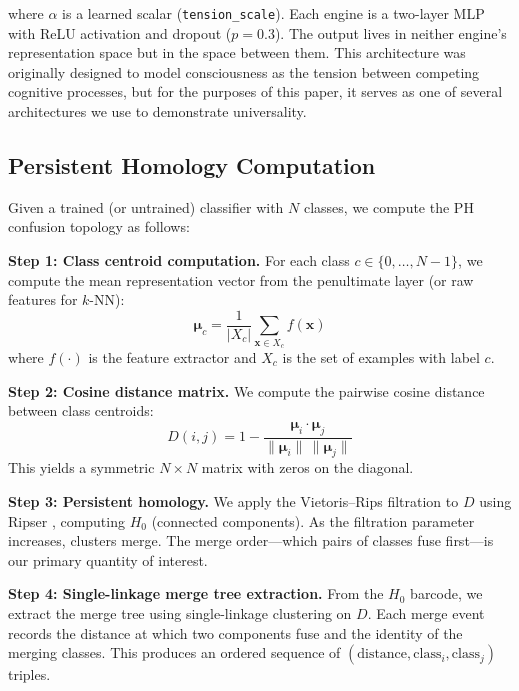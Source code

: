 \documentclass[11pt,a4paper]{article}
\begin{document}
\noindent where $\alpha$ is a learned scalar (\texttt{tension\_scale}). Each engine is a two-layer MLP with ReLU activation and dropout ($p = 0.3$). The output lives in neither engine's representation space but in the space between them. This architecture was originally designed to model consciousness as the tension between competing cognitive processes, but for the purposes of this paper, it serves as one of several architectures we use to demonstrate universality.

\subsection{Persistent Homology Computation}

Given a trained (or untrained) classifier with $N$ classes, we compute the PH confusion topology as follows:

\textbf{Step 1: Class centroid computation.} For each class $c \in \{0, \ldots, N-1\}$, we compute the mean representation vector from the penultimate layer (or raw features for $k$-NN):
\begin{equation}
  \boldsymbol{\mu}_c = \frac{1}{|X_c|} \sum_{\mathbf{x} \in X_c} f(\mathbf{x})
\end{equation}
where $f(\cdot)$ is the feature extractor and $X_c$ is the set of examples with label $c$.

\textbf{Step 2: Cosine distance matrix.} We compute the pairwise cosine distance between class centroids:
\begin{equation}
  D(i,j) = 1 - \frac{\boldsymbol{\mu}_i \cdot \boldsymbol{\mu}_j}{\|\boldsymbol{\mu}_i\| \, \|\boldsymbol{\mu}_j\|}
\end{equation}
This yields a symmetric $N \times N$ matrix with zeros on the diagonal.

\textbf{Step 3: Persistent homology.} We apply the Vietoris--Rips filtration to $D$ using Ripser \citep{bauer2021}, computing $H_0$ (connected components). As the filtration parameter increases, clusters merge. The merge order---which pairs of classes fuse first---is our primary quantity of interest.

\textbf{Step 4: Single-linkage merge tree extraction.} From the $H_0$ barcode, we extract the merge tree using single-linkage clustering on $D$. Each merge event records the distance at which two components fuse and the identity of the merging classes. This produces an ordered sequence of $(\text{distance}, \text{class}_i, \text{class}_j)$ triples.
\end{document}
